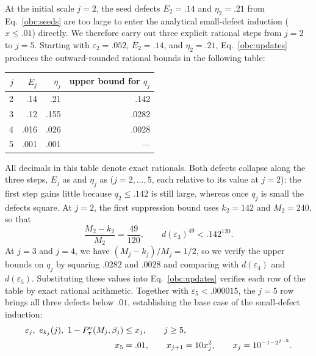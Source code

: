 At the initial scale $j=2$, the seed defects $E_2=.14$ and $\eta_2=.21$ from Eq.~\eqref{obc:seeds} are too large to enter the analytical small-defect induction ($x\le.01$) directly. We therefore carry out three explicit rational steps from $j=2$ to $j=5$. Starting with
$\varepsilon_2=.052$, $E_2=.14$, and $\eta_2=.21$, Eq.~\eqref{obc:updates} produces the outward-rounded rational bounds in the following table:
\begin{center}
\begin{tabular}{@{}rrrr@{}}
\toprule
$j$ & $E_j$ & $\eta_j$ & upper bound for $q_j$\\
\midrule
2 & .14 & .21 & .142\\
3 & .12 & .155 & .0282\\
4 & .016 & .026 & .0028\\
5 & .001 & .001 & ---\\
\bottomrule
\end{tabular}
\end{center}
All decimals in this table denote exact rationals. Both defects collapse
along the three steps, $E_j$ as  and
$\eta_j$ as  ($j=2,\dots,5$, each relative to
its value at $j=2$): the first step gains little because $q_2\le.142$ is
still large, whereas once $q_j$ is small the defects square. At $j=2$,
the first suppression bound uses $k_2=142$ and $M_2=240$, so that
\[
 \frac{M_2-k_2}{M_2}=\frac{49}{120},\qquad
 d(\varepsilon_3)^{49}<.142^{120}.
\]
At $j=3$ and $j=4$, we have $(M_j-k_j)/M_j=1/2$, so we verify the upper bounds on $q_j$ by squaring $.0282$ and $.0028$ and comparing with
$d(\varepsilon_4)$ and $d(\varepsilon_5)$.
Substituting these values into Eq.~\eqref{obc:updates} verifies each row of the table by exact rational arithmetic. Together with
$\varepsilon_5<.000015$, the $j=5$ row brings all three defects below $.01$, establishing the base case of the small-defect induction:
\begin{align}
 \varepsilon_j,\ e_{k_j}(j),\
 1-P_{\tau}^{\mathrm{o}}(M_j,\beta_j)&\le x_j,\qquad j\ge5,\notag \\
 x_5&=.01,\qquad x_{j+1}=10x_j^2,\qquad
 x_j=10^{-1-2^{j-5}}.
 \label{obc:induction}
\end{align}

